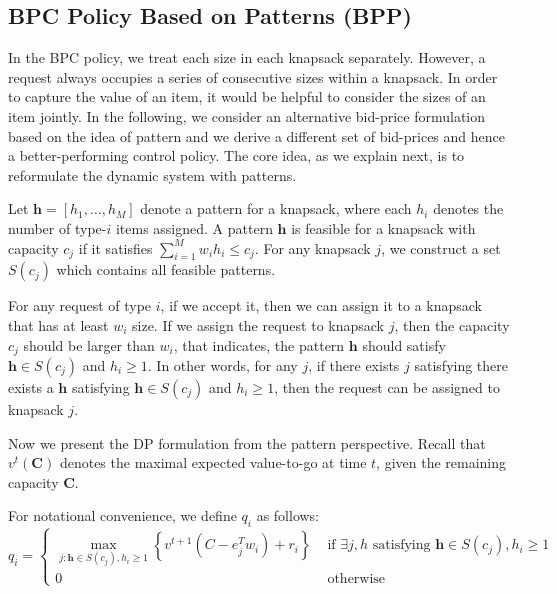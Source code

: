 \subsection{BPC Policy Based on Patterns (BPP)}
In the BPC policy, we treat each size in each knapsack separately. However, a request always occupies
a series of consecutive sizes within a knapsack. In order to capture the value of an item, it would be helpful to consider the sizes of an item jointly. In the following, we consider an alternative bid-price formulation based on the idea of pattern and we derive a different set of bid-prices and hence a better-performing control policy. The core idea, as we explain next, is to reformulate the
dynamic system with patterns.


Let $\bm{h} = [h_{1}, \ldots, h_{M}]$ denote a pattern for a knapsack, where each $h_i$ denotes the number of type-$i$ items assigned. A pattern $\bm{h}$ is feasible for a knapsack with capacity $c_{j}$ if it satisfies $\sum_{i=1}^{M} w_{i} h_{i} \leq c_{j}$. For any knapsack $j$, we
construct a set $S(c_{j})$ which contains all feasible patterns.


For any request of type $i$, if we accept it, then we can assign it to a knapsack that has at least $w_{i}$ size. If we assign the request to knapsack $j$, then the capacity $c_{j}$ should be larger than $w_{i}$, that indicates, the pattern $\bm{h}$ should satisfy $\bm{h} \in S(c_{j})$ and $h_{i} \geq 1$. 
In other words, for any $j$, if there exists $j$ satisfying there exists a $\bm{h}$ satisfying $\bm{h} \in S(c_{j})$ and $h_{i} \geq 1$, then the request can be assigned to knapsack $j$. 




Now we present the DP formulation from the pattern perspective. Recall that $v^t(\bm{C})$ denotes the maximal expected value-to-go at time $t$, given the remaining capacity $\bm{C}$. 

For notational convenience, we define $q_i$ as follows:
\begin{equation*}
    q_i= \begin{cases}\max _{j: \bm{h} \in S\left(c_j\right), h_i \geq 1}\left\{v^{t+1}\left(C-e_j^T w_i\right)+r_i\right\} & \text { if } \exists j, h \text{ satisfying } \bm{h} \in S\left(c_j\right), h_i \geq 1 \\ 0 & \text { otherwise }\end{cases}
\end{equation*}

